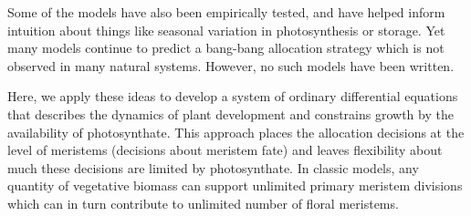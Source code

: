 \documentclass[12pt, oneside]{article}   	%
\begin{document}
Some of the models have also been empirically tested, and have helped inform intuition about things like seasonal variation in photosynthesis or storage. Yet many models continue to predict a bang-bang allocation strategy which is not observed in many natural systems.  However, no such models have been written.

Here, we apply these ideas to develop a system of ordinary differential equations that describes the dynamics of plant development and constrains growth by the availability of photosynthate. This approach places the allocation decisions at the level of meristems (decisions about meristem fate) and leaves flexibility about much these decisions are limited by photosynthate. In classic models, any quantity of vegetative biomass can support unlimited primary meristem divisions which can in turn  contribute to unlimited number of floral meristems.
\end{document}
